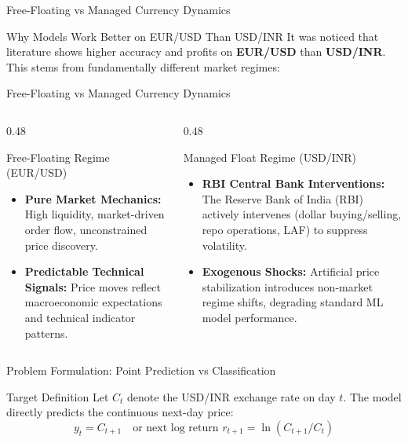 \documentclass[aspectratio=169]{beamer}
\begin{document}
\begin{frame}{Free-Floating vs Managed Currency Dynamics}
	\begin{block}{Why Models Work Better on EUR/USD Than USD/INR}
		It was noticed that literature shows higher accuracy and profits on \textbf{EUR/USD} than \textbf{USD/INR}. This stems from fundamentally different market regimes:
	\end{block}
\end{frame}

\begin{frame}{Free-Floating vs Managed Currency Dynamics}
	
	\begin{columns}[T]
		\begin{column}{0.48\textwidth}
			\begin{block}{Free-Floating Regime (EUR/USD)}
				\begin{itemize}
					\item \textbf{Pure Market Mechanics:} High liquidity, market-driven order flow, unconstrained price discovery.
					\item \textbf{Predictable Technical Signals:} Price moves reflect macroeconomic expectations and technical indicator patterns.
				\end{itemize}
			\end{block}
		\end{column}
		\begin{column}{0.48\textwidth}
			\begin{block}{Managed Float Regime (USD/INR)}
				\begin{itemize}
					\item \textbf{RBI Central Bank Interventions:} The Reserve Bank of India (RBI) actively intervenes (dollar buying/selling, repo operations, LAF) to suppress volatility.
					\item \textbf{Exogenous Shocks:} Artificial price stabilization introduces non-market regime shifts, degrading standard ML model performance.
				\end{itemize}
			\end{block}
		\end{column}
	\end{columns}
\end{frame}

\begin{frame}{Problem Formulation: Point Prediction vs Classification}
	\begin{block}{Target Definition}
		Let $C_t$ denote the USD/INR exchange rate on day $t$. The model directly predicts the continuous next-day price:
		\begin{equation}
			y_t = C_{t+1} \quad \text{or next log return } r_{t+1} = \ln(C_{t+1}/C_t)
		\end{equation}
	\end{block}
\end{frame}
\end{document}
